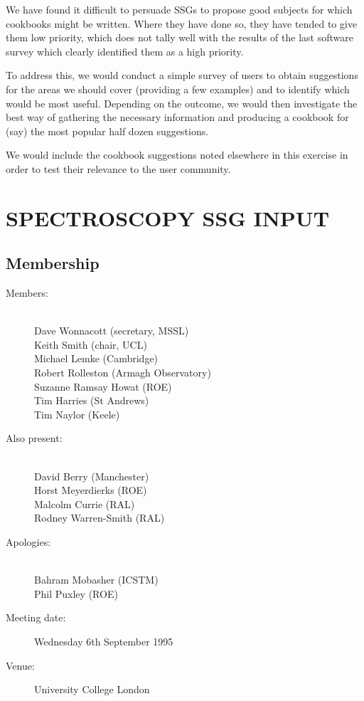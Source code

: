 {We have found it difficult to persuade SSGs to propose good subjects
for which cookbooks might be written. Where they have done so, they
have tended to give them low priority, which does not tally well with
the results of the last software survey which clearly identified them
as a high priority.

To address this, we would conduct a simple survey of users to obtain
suggestions for the areas we should cover (providing a few examples)
and to identify which would be most useful. Depending on the outcome,
we would then investigate the best way of gathering the necessary
information and producing a cookbook for (say) the most popular half
dozen suggestions.

We would include the cookbook suggestions noted elsewhere in this
exercise in order to test their relevance to the user community.}

\newpage
\appendix
\section{SPECTROSCOPY SSG INPUT}

\subsection{Membership}

\begin{description}
\item[Members:]\mbox{}\\
Dave Wonnacott (secretary, MSSL)\\
Keith Smith (chair, UCL)\\
Michael Lemke (Cambridge)\\
Robert Rolleston (Armagh Observatory)\\
Suzanne Ramsay Howat (ROE)\\ 
Tim Harries (St Andrews)\\
Tim Naylor (Keele)

\item[Also present:]\mbox{}\\
David Berry (Manchester)\\
Horst Meyerdierks (ROE)\\
Malcolm Currie (RAL)\\
Rodney Warren-Smith (RAL)

\item[Apologies:]\mbox{}\\
Bahram Mobasher (ICSTM)\\
Phil Puxley (ROE)

\item[Meeting date:]Wednesday 6th September 1995

\item[Venue:]University College London
\end{description}


